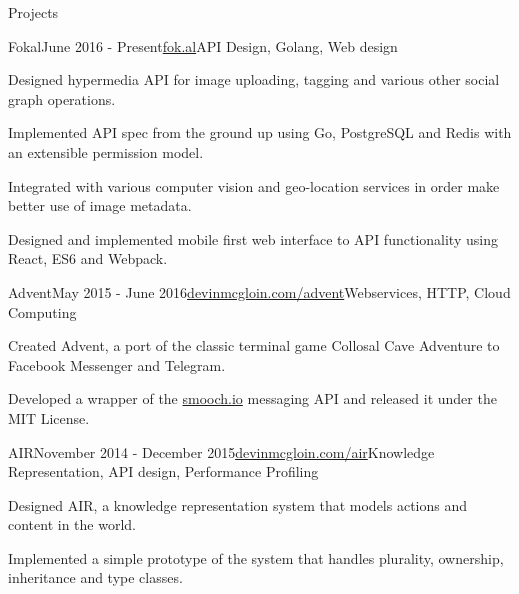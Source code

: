 \documentclass{resume} %
\begin{document}
\begin{rSection}{Projects}


\begin{rSubsection}{Fokal}{June 2016 - Present}{\href{https://fok.al}{fok.al}}{API Design, Golang, Web design}
\item Designed hypermedia API for image uploading, tagging and various other social graph operations.
\item Implemented API spec from the ground up using Go, PostgreSQL and Redis with an extensible permission model.
\item Integrated with various computer vision and geo-location services in order make better use of image metadata.
\item Designed and implemented mobile first web interface to API functionality using React, ES6 and Webpack.
\end{rSubsection}


\begin{rSubsection}{Advent}{May 2015 - June 2016}{\href{https://devinmcgloin.com/advent}{devinmcgloin.com/advent}}{Webservices, HTTP, Cloud Computing}
\item Created Advent, a port of the classic terminal game Collosal Cave Adventure to Facebook Messenger and Telegram.
\item Developed a wrapper of the \href{https://smooch.io}{smooch.io} messaging API and released it under the MIT License.
\end{rSubsection}


\begin{rSubsection}{AIR}{November 2014 - December 2015}{\href{https://devinmcgloin.com/AIR}{devinmcgloin.com/air}}{Knowledge Representation, API design, Performance Profiling}
\item Designed AIR, a knowledge representation system that models actions and content in the world.
\item Implemented a simple prototype of the system that handles plurality, ownership, inheritance and type classes.
\end{rSubsection}
\end{rSection}

\end{document}
